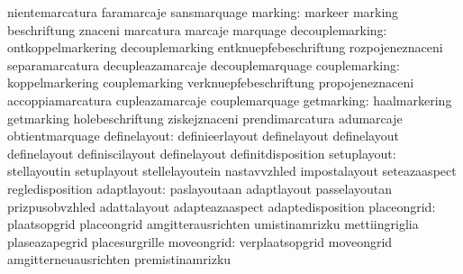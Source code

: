                                   nientemarcatura                  faramarcaje
                                  sansmarquage
                         marking: markeer                          marking
                                  beschriftung                     znaceni
                                  marcatura                        marcaje
                                  marquage
                 decouplemarking: ontkoppelmarkering               decouplemarking
                                  entknuepfebeschriftung           rozpojeneznaceni
                                  separamarcatura                  decupleazamarcaje
                                  decouplemarquage
                   couplemarking: koppelmarkering                  couplemarking
                                  verknuepfebeschriftung           propojeneznaceni
                                  accoppiamarcatura                cupleazamarcaje
                                  couplemarquage
                      getmarking: haalmarkering                    getmarking
                                  holebeschriftung                 ziskejznaceni
                                  prendimarcatura                  adumarcaje
                                  obtientmarquage
                    definelayout: definieerlayout                  definelayout
                                  definelayout                     definelayout
                                  definiscilayout                  definelayout
                                  definitdisposition
                     setuplayout: stellayoutin                     setuplayout
                                  stellelayoutein                  nastavvzhled
                                  impostalayout                    seteazaaspect
                                  regledisposition
                     adaptlayout: paslayoutaan                     adaptlayout
                                  passelayoutan                    prizpusobvzhled
                                  adattalayout                     adapteazaaspect
                                  adaptedisposition
                     placeongrid: plaatsopgrid                     placeongrid
                                  amgitterausrichten               umistinamrizku
                                  mettiingriglia                   plaseazapegrid
                                  placesurgrille
                      moveongrid: verplaatsopgrid                  moveongrid
                                  amgitterneuausrichten            premistinamrizku
